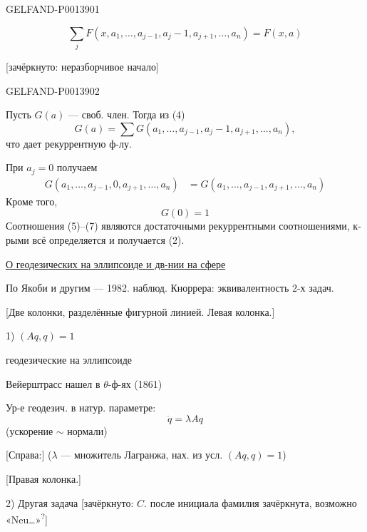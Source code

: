 \begin{GelfandAdjacentEvidence}{GELFAND-P001390}{1}

\begin{equation*}
\sum_j F(x,a_1,\ldots,a_{j-1},a_j-1,a_{j+1},\ldots,a_n)=F(x,a)
\tag{4}
\end{equation*}

[зачёркнуто: неразборчивое начало]
\end{GelfandAdjacentEvidence}
\begin{GelfandAdjacentEvidence}{GELFAND-P001390}{2}

Пусть \(G(a)\) --- своб. член. Тогда из (4)
\begin{equation*}
G(a)=\sum G(a_1,\ldots,a_{j-1},a_j-1,a_{j+1},\ldots,a_n),
\tag{5}
\end{equation*}
что дает рекуррентную ф-лу.

При \(a_j=0\) получаем
\begin{equation*}
\begin{aligned}
G(a_1,\ldots,a_{j-1},0,a_{j+1},\ldots,a_n)
&=G(a_1,\ldots,a_{j-1},a_{j+1},\ldots,a_n)
\end{aligned}
\tag{6}
\end{equation*}
Кроме того,
\begin{equation*}
G(0)=1
\tag{7}
\end{equation*}
Соотношения (5)--(7) являются достаточными рекуррентными соотношениями, к-рыми всё определяется и получается (2).


\uline{О геодезических на эллипсоиде и дв-нии на сфере}

По Якоби и другим --- 1982. наблюд. Кноррера: эквивалентность 2-х задач.

[Две колонки, разделённые фигурной линией. Левая колонка.]

1) \((Aq,q)=1\)

геодезические на эллипсоиде

Вейерштрасс нашел в \(\theta\)-ф-ях (1861)

Ур-е геодезич. в натур. параметре:
\begin{equation*}
\ddot q=\lambda Aq
\tag{1}
\end{equation*}
(ускорение \(\sim\) нормали)

[Справа:] (\(\lambda\) --- множитель Лагранжа, нах. из усл. \((Aq,q)=1\))

[Правая колонка.]

2) Другая задача [зачёркнуто:
\(C.\) после инициала фамилия зачёркнута, возможно «Neu…»\textsuperscript{?}]
\end{GelfandAdjacentEvidence}
